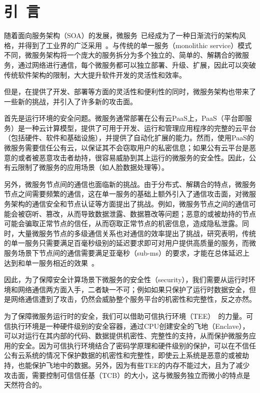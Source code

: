 \section{引\ 言}\label{sec:introduction}

随着面向服务架构（SOA）的发展，微服务~\cite{}已经成为了一种日渐流行的架构风格，并得到了工业界的广泛采用~\cite{}。与传统的单一服务（monolithic service）模式不同，微服务架构将一个庞大的服务拆分为多个独立的、简单的、解耦合的微服务，通过网络进行通信，每个微服务都可以独立部署、升级、扩展，因此可以突破传统软件架构的限制，大大提升软件开发的灵活性和效率。


但是，在提供了开发、部署等方面的灵活性和便利性的同时，微服务架构也带来了一些新的挑战，并引入了许多新的攻击面。

首先是运行环境的安全问题。微服务通常部署在公有云PaaS上，PaaS（平台即服务）是一种云计算模型，提供了可用于开发、运行和管理应用程序的完整的云平台（包括硬件、软件和基础设施），并提供了自动化扩展的能力。然而，使用PaaS的微服务需要信任公有云，以保证其不会窃取用户的私密信息；如果公有云平台是恶意的或者被恶意攻击者劫持，很容易威胁到其上运行的微服务的安全性。因此，公有云限制了微服务的应用场景（如人脸数据处理等）。

另外，微服务节点间的通信也面临新的挑战。由于分布式、解耦合的特点，微服务节点之间需要频繁的通信，这在单一服务的基础上额外引入了通信攻击面，对微服务架构的通信安全和节点认证等方面提出了挑战。例如，微服务节点之间的通信可能会被窃听、篡改，从而导致数据泄露、数据篡改等问题；恶意的或被劫持的节点可能会骗取正常节点的信任，从而窃取正常节点的机密信息，造成隐私泄露。同时，大量微服务节点的多级通信关系也对通信的效率提出了挑战，研究表明，传统的单一服务只需要满足百毫秒级别的延迟要求即可对用户提供高质量的服务，而微服务场景下节点间的通信需要满足亚毫秒（sub-ms）的要求，才能在总体延迟上达到和单一服务相近的效果~\cite{}。

因此，为了保障安全计算场景下微服务的安全性（security），我们需要从运行时环境和网络通信两方面入手，二者缺一不可；例如如果只保护了运行时数据安全，但是网络通信遭到了攻击，仍然会威胁整个服务平台的机密性和完整性，反之亦然。

为了保障微服务运行时的安全，我们可以借助可信执行环境（TEE）~\cite{}的力量。可信执行环境是一种硬件级别的安全容器，通过CPU创建安全的飞地（Enclave），可以对运行在其内部的代码、数据提供机密性、完整性的支持，从而保护微服务应用的安全。因为可信执行环境结合了密码学原理和硬件级别的保护，可以在不信任公有云系统的情况下保护数据的机密性和完整性，即使云上系统是恶意的或被劫持，也能保护飞地中的数据。另外，因为有些TEE的内存不能过大，且为了减少攻击面，需要控制可信信任基（TCB）的大小，这与微服务独立而微小的特点是天然符合的。

